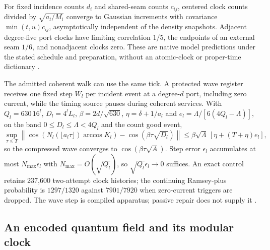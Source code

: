 \documentclass[11pt]{article}
\theoremstyle{definition}
\theoremstyle{remark}
\theoremstyle{plain}
\begin{document}
For fixed incidence counts $d_i$ and shared-seam counts $c_{ij}$, centered
clock counts divided by $\sqrt{a_l/M_l}$ converge to Gaussian increments with
covariance $\min(t,u)c_{ij}$, asymptotically independent of the density
snapshots. Adjacent degree-five port clocks have limiting correlation $1/5$,
the endpoints of an external seam $1/6$, and nonadjacent clocks zero. These
are native model predictions under the stated schedule and preparation,
without an atomic-clock or proper-time dictionary \cite{nativeClockLimit}.

The admitted coherent walk can use the same tick. A protected wave register
receives one fixed step $W_l$ per incident event at a degree-$d$ port,
including zero current, while the timing source pauses during coherent
services. With $Q_l=630\,16^l$, $D_l=4^lL_l$, $\beta=2d/\sqrt{630}$,
$\eta=\delta+1/a_l$ and $e_l=\Lambda/[6(4Q_l-\Lambda)]$, on the band
$0\le D_l\le\Lambda<4Q_l$ and the count good event,
\[
 \sup_{\tau\le T}\left\|
 \cos\!\left(N_l(\lfloor a_l\tau\rfloor)\arccos K_l\right)
       -\cos(\beta\tau\sqrt{D_l})\right\|
 \le\beta\sqrt\Lambda\,[\eta+(T+\eta)e_l],
\]
so the compressed wave converges to $\cos(\beta\tau\sqrt A)$. Step error
$\epsilon_l$ accumulates at most $N_{\max}\epsilon_l$ with
$N_{\max}=O(\sqrt{Q_l})$, so $\sqrt{Q_l}\epsilon_l\to0$ suffices. An exact
control retains 237,600 two-attempt clock histories; the continuing
Ramsey-plus probability is $1297/1320$ against $7901/7920$ when
zero-current triggers are dropped. The wave step is compiled apparatus;
passive repair does not supply it \cite{nativeClockLimit}.

\subsection{An encoded quantum field and its modular clock}
\label{sec:encoded-field}
\end{document}
